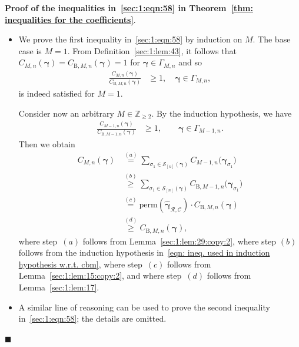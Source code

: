 \documentclass[journal,lettersize,twocolumn]{IEEEtran} %
\renewcommand\qedsymbol{$\blacksquare$}
\newcommand{\etheoremproof}{\hfill\qedsymbol}
\newcommand{\vect}[1]{ \bm{#1} }
\newcommand{\set}[1]{\mathcal{#1}}
\newcommand{\vgam}{ \vect{\gamma} }
\newcommand{\sZ}{\mathbb{Z}}
\newcommand{\perm}{ \mathrm{perm} }
\newcommand{\setC}{\set{C}}
\newcommand{\setR}{\set{R}}
\newcommand{\setS}{\set{S}}
\newcommand{\CM}[1]{\Cgen{M}{#1}}
\newcommand{\Cgen}[2]{C_{#1,#2}}
\newcommand{\CBM}[1]{\CBgen{M}{#1}}
\newcommand{\CBgen}[2]{C_{\mathrm{B},#1,#2}}
\newcommand{\hvgamRCp}{ \hat{\vgam}_{\setR,\setC} }
\begin{document}
\noindent
\textbf{Proof of the inequalities in~\eqref{sec:1:eqn:58} in Theorem~\ref{thm:
    inequalities for the coefficients}}.
\begin{itemize}

\item We prove the first inequality in~\eqref{sec:1:eqn:58} by induction on
  $M$. The base case is $M = 1$. From Definition~\ref{sec:1:lem:43}, it
  follows that $\CM{n}(\vgam) = \CBM{n}(\vgam) = 1$ for
  $\vgam \in \Gamma_{M,n}$ and so
  \begin{align*}
    \frac{\CM{n}(\vgam)}
         {\CBM{n}(\vgam)}
      &\geq 1,
         \quad \vgam \in \Gamma_{M,n},
  \end{align*}
  is indeed satisfied for $M = 1$.

  Consider now an arbitrary $M \in \sZ_{\geq 2}$. By the induction hypothesis,
  we have
  \begin{align}
    \frac{ \Cgen{M-1}{n}(\vgam) }{\CBgen{M-1}{n}(\vgam) }
      &\geq 
        1, \qquad \vgam \in \Gamma_{M-1,n}.
    \label{eqn: ineq. used in induction hypothesis w.r.t. cbm}
  \end{align}
  Then we obtain
  \begin{align*}
    \CM{n}( \vgam )
    &\overset{(a)}{=} \sum_{\sigma_1 \in \setS_{[n]}( \vgam )}
         \Cgen{M-1}{n}\bigl( 
            \vgam_{\sigma_1}
    \bigr) 
    \nonumber \\
    &\overset{(b)}{\geq}
    \sum_{\sigma_1 \in \setS_{[n]}( \vgam )}
         \CBgen{M-1}{n}\bigl( 
            \vgam_{\sigma_1}
    \bigr)
    \nonumber \\ 
    &\overset{(c)}{=} \perm(\hvgamRCp) \cdot \CBM{n}(\vgam)
    \nonumber \\
    &\overset{(d)}{\geq} \CBM{n}(\vgam),
\end{align*}
where step~$(a)$ follows from Lemma~\ref{sec:1:lem:29:copy:2}, where step
$(b)$ follows from the induction hypothesis in~\eqref{eqn: ineq. used in
  induction hypothesis w.r.t. cbm}, where step~$(c)$ follows from
Lemma~\ref{sec:1:lem:15:copy:2}, and where step~$(d)$ follows from
Lemma~\ref{sec:1:lem:17}. 

\item A similar line of reasoning can be used to prove the second inequality
  in~\eqref{sec:1:eqn:58}; the details are omitted.

\end{itemize}
\etheoremproof

%

\medskip
\end{document}
